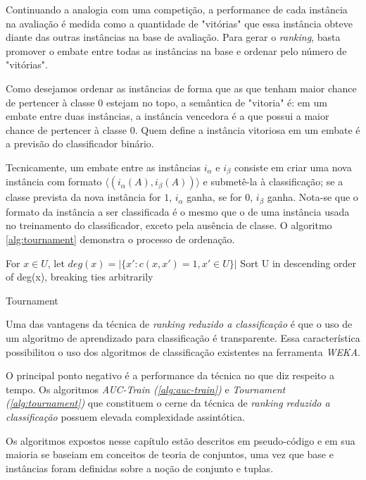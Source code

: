 Continuando a analogia com uma competição, a performance de cada instância na avaliação é medida como a quantidade de "vitórias" que essa instância obteve diante das outras instâncias na base de avaliação. Para gerar o \emph{ranking}, basta promover o embate entre todas as instâncias na base e ordenar pelo número de "vitórias".

Como desejamos ordenar as instâncias de forma que as que tenham maior chance de pertencer à classe $0$ estejam no topo, a semântica de "vitoria" é: em um embate entre duas instâncias, a instância vencedora é a que possui a maior chance de pertencer à classe $0$. Quem define a instância vitoriosa em um embate é a previsão do classificador binário.

Tecnicamente, um embate entre as instâncias $i_\alpha$ e $i_\beta$ consiste em criar uma nova instância com formato $\langle (i_{\alpha}(A), i_{\beta}(A))\rangle$ e submetê-la à classificação; se a classe prevista da nova instância for $1$, $i_{\alpha}$ ganha, se for $0$, $i_{\beta}$ ganha. Nota-se que o formato da instância a ser classificada é o mesmo que o de uma instância usada no treinamento do classificador, exceto pela ausência de classe. O algoritmo \ref{alg:tournament} demonstra o processo de ordenação.

\begin{algorithm}
    For $x \in U$, let $deg(x) = |\{x':c(x, x') = 1, x' \in U\}|$
    Sort U in descending order of deg(x), breaking ties arbitrarily
    
    \caption{Tournament}
    \label{alg:tournament}
\end{algorithm}

Uma das vantagens da técnica de \emph{ranking reduzido a classificação} é que o uso de um algoritmo de aprendizado para classificação é transparente. Essa característica possibilitou o uso dos algoritmos de classificação existentes na ferramenta \emph{WEKA}.

O principal ponto negativo é a performance da técnica no que diz respeito a tempo. Os algoritmos \emph{AUC-Train (\ref{alg:auc-train})} e \emph{Tournament (\ref{alg:tournament})} que constituem o cerne da técnica de \emph{ranking reduzido a classificação} possuem elevada complexidade assintótica.

Os algoritmos expostos nesse capítulo estão descritos em pseudo-código e em sua maioria se baseiam em conceitos de teoria de conjuntos, uma vez que base e instâncias foram definidas sobre a noção de conjunto e tuplas.

